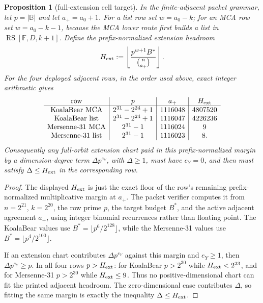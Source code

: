 \documentclass[a4paper,11pt]{amsart}
\newtheorem{proposition}[theorem]{Proposition}
\theoremstyle{remark}
\newcommand{\F}{\mathbb F}
\newcommand{\B}{\mathbb B}
\newcommand{\RS}{\operatorname{RS}}
\begin{document}
\begin{proposition}[full-extension cell target]\label{prop:extension-cell-target}
In the finite-adjacent packet grammar, let \(p=|\B|\) and let \(a_+=a_0+1\).  For a list row set \(w=a_0-k\); for an MCA row set \(w=a_0-k-1\), because the MCA lower route first builds a list in \(\RS[\F,D,k+1]\).  Define the prefix-normalized extension headroom
\[
        H_{\rm ext}
        :=
        \left\lfloor \frac{p^{w+1}B^*}{\binom n{a_+}}\right\rfloor .
\]
For the four deployed adjacent rows, in the order used above, exact integer arithmetic gives
\[
\begin{array}{c|c|c|c}
\text{row} & p & a_+ & H_{\rm ext}\\ \hline
\text{KoalaBear MCA} & 2^{31}-2^{24}+1 & 1116048 & 4807520\\
\text{KoalaBear list} & 2^{31}-2^{24}+1 & 1116047 & 4226236\\
\text{Mersenne-31 MCA} & 2^{31}-1 & 1116024 & 9\\
\text{Mersenne-31 list} & 2^{31}-1 & 1116023 & 8 .
\end{array}
\]
Consequently any full-orbit extension chart paid in this prefix-normalized margin by a dimension-degree term \(\Delta p^{e_Y}\), with \(\Delta\ge1\), must have \(e_Y=0\), and then must satisfy \(\Delta\le H_{\rm ext}\) in the corresponding row.
\end{proposition}

\begin{proof}
The displayed \(H_{\rm ext}\) is just the exact floor of the row's remaining prefix-normalized multiplicative margin at \(a_+\).  The packet verifier computes it from \(n=2^{21}\), \(k=2^{20}\), the row prime \(p\), the target budget \(B^*\), and the active adjacent agreement \(a_+\), using integer binomial recurrences rather than floating point.  The KoalaBear values use \(B^*=\lfloor p^6/2^{128}\rfloor\), while the Mersenne-31 values use \(B^*=\lfloor p^4/2^{100}\rfloor\).

If an extension chart contributes \(\Delta p^{e_Y}\) against this margin and \(e_Y\ge1\), then \(\Delta p^{e_Y}\ge p\).  In all four rows \(p>H_{\rm ext}\): for KoalaBear \(p>2^{30}\) while \(H_{\rm ext}<2^{23}\), and for Mersenne-31 \(p>2^{30}\) while \(H_{\rm ext}\le9\).  Thus no positive-dimensional chart can fit the printed adjacent headroom.  The zero-dimensional case contributes \(\Delta\), so fitting the same margin is exactly the inequality \(\Delta\le H_{\rm ext}\).
\end{proof}
\end{document}
